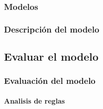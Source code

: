     \newpage
    \subsubsection{Modelos}

        \def\RUN{1}
        \def\title{Resultados de la corrida 1 del arbol de decisión J48}
        \def\algorithm{weka}
        \def\numberOfRules{17}
        \def\hasRules{1}
        
        \newpage

        \def\RUN{2}
        \def\title{Resultados de la corrida 2 del arbol de decisión J48}
        \def\algorithm{weka}
        \def\numberOfRules{20}
        \def\hasRules{1}
        
        \newpage

        \def\RUN{1}
        \def\title{Resultados de la corrida de Perceptron}
        \def\algorithm{perceptron}
        \def\numberOfRules{20}
        \def\hasRules{0}
        

    \subsubsection{Descripción del modelo}
\subsection{Evaluar el modelo}
    \subsubsection{Evaluación del modelo}
        \paragraph{Analisis de reglas}

